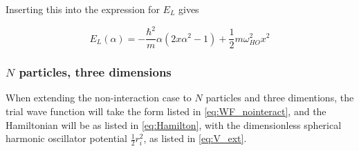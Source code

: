 \documentclass[norsk,a4paper,12pt]{article}
\begin{document}
Inserting this into the expression for $E_L$ gives

\begin{equation}
E_L(\alpha) = -\frac{\hbar^2}{m} \alpha (2x\alpha^2 -1) + \frac{1}{2} m\omega_{HO}^2x^2
\end{equation}
\fi

\subsubsection{$N$ particles, three dimensions}

When extending the non-interaction case to $N$ particles and three dimentions, the trial wave function will take the form listed in \ref{eq:WF_nointeract}, and the Hamiltonian will be as listed in \ref{eq:Hamilton}, with the dimensionless spherical harmonic oscillator potential $\frac{1}{2}r_i^2$, as listed in \ref{eq:V_ext}.

\end{document}
